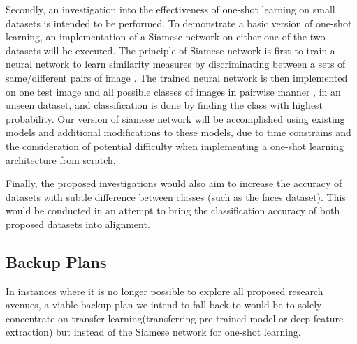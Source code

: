 \documentclass{article}
\begin{document}
Secondly, an investigation into the effectiveness of one-shot learning on small datasets is intended to be performed. To demonstrate a basic version of one-shot learning, an implementation of a Siamese network \cite{bromley1994signature} on either one of the two datasets will be executed. The principle of Siamese network is first to train a neural network to learn similarity measures by discriminating between a sets of same/different pairs of image \cite{koch2015}. The trained neural network is then implemented on one test image and all possible classes of images in pairwise manner , in an unseen dataset, and classification is done by finding the class with highest probability.   Our version of siamese network will be accomplished using existing models and additional modifications to these models, due to time constrains and the consideration of potential difficulty when implementing a one-shot learning architecture from scratch.

Finally, the proposed investigations would also aim to increase the accuracy of datasets with subtle difference between classes (such as the faces dataset). This would be conducted in an attempt to bring the classification accuracy of both proposed datasets into alignment.

\subsection{Backup Plans}
\label{sec:plans}

In instances where it is no longer possible to explore all proposed research avenues, a viable backup plan we intend to fall back to would be to solely concentrate on transfer learning(transferring pre-trained model or deep-feature extraction) but instead of the Siamese network for one-shot learning. 



\end{document}
